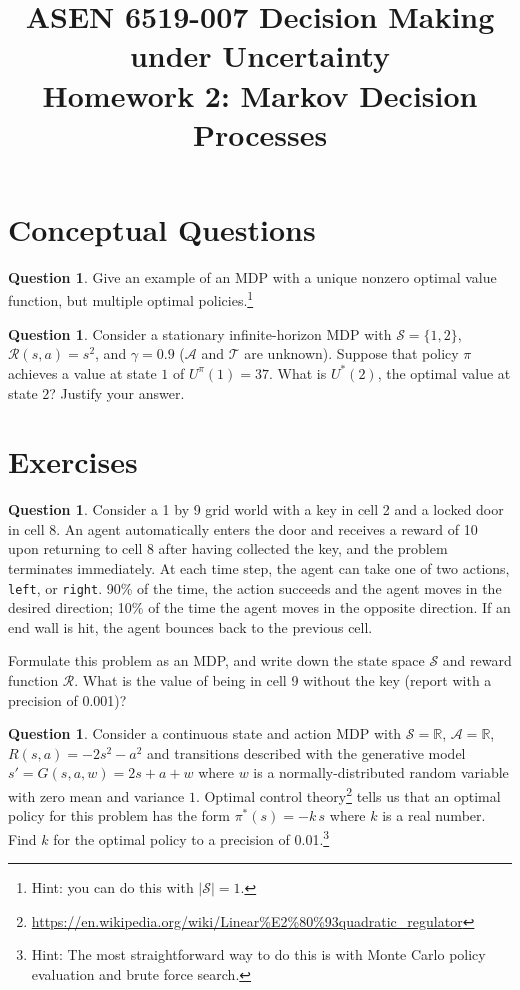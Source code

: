 \documentclass{article}
\title{ASEN 6519-007 Decision Making under Uncertainty\\
       Homework 2: Markov Decision Processes}
\theoremstyle{definition}
\newtheorem{question}[thm]{Question}
\newcommand{\reals}{\mathbb{R}}
\begin{document}
\maketitle

\section{Conceptual Questions}

\begin{question}
    Give an example of an MDP with a unique nonzero optimal value function, but multiple optimal policies.\footnote{Hint: you can do this with $|\mathcal{S}| = 1$.}
\end{question}

\begin{question}
    Consider a stationary infinite-horizon MDP with $\mathcal{S} = \{1,2\}$, $\mathcal{R}(s, a) = s^2$, and $\gamma = 0.9$ ($\mathcal{A}$ and $\mathcal{T}$ are unknown). Suppose that policy $\pi$ achieves a value at state $1$ of $U^\pi(1) = 37$. What is $U^*(2)$, the optimal value at state $2$? Justify your answer.
\end{question}

\section{Exercises}

\begin{question}
    Consider a 1 by 9 grid world with a key in cell 2 and a locked door in cell 8. An agent automatically enters the door and receives a reward of 10 upon returning to cell 8 after having collected the key, and the problem terminates immediately. At each time step, the agent can take one of two actions, \texttt{left}, or \texttt{right}. 90\% of the time, the action succeeds and the agent moves in the desired direction; 10\% of the time the agent moves in the opposite direction. If an end wall is hit, the agent bounces back to the previous cell.

    Formulate this problem as an MDP, and write down the state space $\mathcal{S}$ and reward function $\mathcal{R}$. What is the value of being in cell 9 without the key (report with a precision of 0.001)?

\end{question}

\begin{question}
    Consider a continuous state and action MDP with $\mathcal{S} = \reals$, $\mathcal{A} = \reals$, $R(s, a) = - 2s^2 - a^2$ and transitions described with the generative model $s' = G(s, a, w) = 2s + a + w$ where $w$ is a normally-distributed random variable with zero mean and variance $1$. Optimal control theory\footnote{\url{https://en.wikipedia.org/wiki/Linear\%E2\%80\%93quadratic_regulator}} tells us that an optimal policy for this problem has the form $\pi^*(s) = -k\,s$ where $k$ is a real number. Find $k$ for the optimal policy to a precision of 0.01.\footnote{Hint: The most straightforward way to do this is with Monte Carlo policy evaluation and brute force search.}
\end{question}
\end{document}
